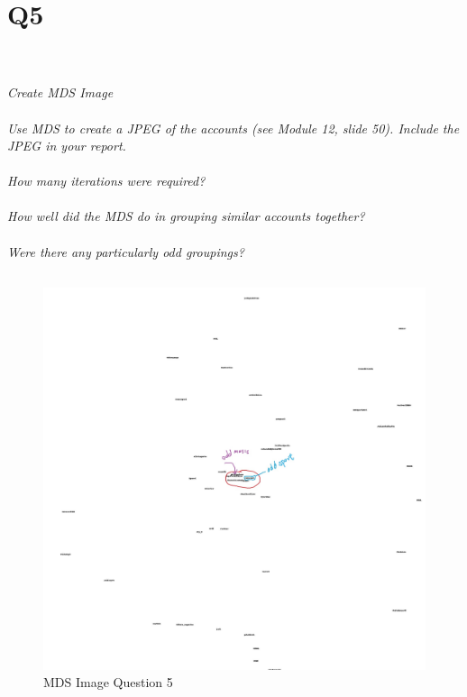 \documentclass[12pt]{article}
\begin{document}
\section*{Q5}
\emph{
\\ \\Create MDS Image
\\ \\Use MDS to create a JPEG of the accounts (see Module 12, slide 50). Include the JPEG in your report.
\\ \\How many iterations were required?
\\ \\How well did the MDS do in grouping similar accounts together?
\\ \\Were there any particularly odd groupings?}
\subsection*{\color{blue}{Answer}}
 \begin{figure}[H]
            \centering
            \includegraphics[width=\textwidth,height=\textheight,keepaspectratio]{tweets2d.jpg}
            \caption{ MDS Image Question 5}
            \label{fig:3}
\end{figure}
\end{document}

